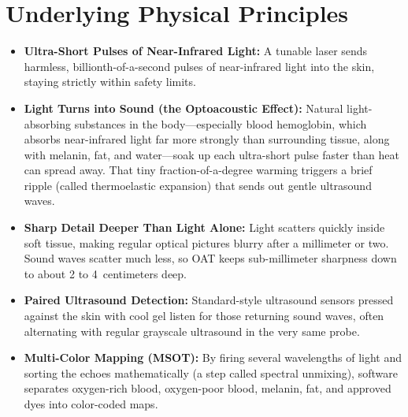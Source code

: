 \section{Underlying Physical Principles}
\begin{itemize}
  \item \textbf{Ultra-Short Pulses of Near-Infrared Light:} A tunable laser sends harmless, billionth-of-a-second pulses of near-infrared light into the skin, staying strictly within safety limits.
  \item \textbf{Light Turns into Sound (the Optoacoustic Effect):} Natural light-absorbing substances in the body---especially blood hemoglobin, which absorbs near-infrared light far more strongly than surrounding tissue, along with melanin, fat, and water---soak up each ultra-short pulse faster than heat can spread away. That tiny fraction-of-a-degree warming triggers a brief ripple (called thermoelastic expansion) that sends out gentle ultrasound waves.
  \item \textbf{Sharp Detail Deeper Than Light Alone:} Light scatters quickly inside soft tissue, making regular optical pictures blurry after a millimeter or two. Sound waves scatter much less, so OAT keeps sub-millimeter sharpness down to about 2 to 4~centimeters deep.
  \item \textbf{Paired Ultrasound Detection:} Standard-style ultrasound sensors pressed against the skin with cool gel listen for those returning sound waves, often alternating with regular grayscale ultrasound in the very same probe.
  \item \textbf{Multi-Color Mapping (MSOT):} By firing several wavelengths of light and sorting the echoes mathematically (a step called spectral unmixing), software separates oxygen-rich blood, oxygen-poor blood, melanin, fat, and approved dyes into color-coded maps.
\end{itemize}

